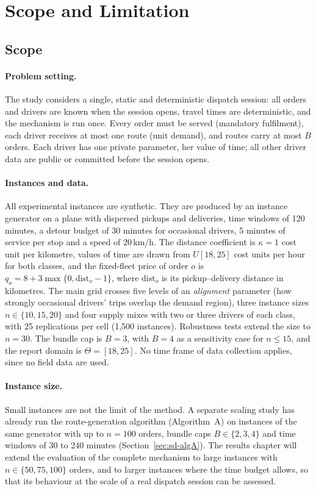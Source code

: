 \section{Scope and Limitation}
\label{sec:scope}

\subsection{Scope}

\paragraph{Problem setting.} The study considers a single, static and
deterministic dispatch session: all orders and drivers are known when the
session opens, travel times are deterministic, and the mechanism is run once.
Every order must be served (mandatory fulfilment), each driver receives at
most one route (unit demand), and routes carry at most $B$ orders. Each
driver has one private parameter, her value of time; all other driver data
are public or committed before the session opens.

\paragraph{Instances and data.} All experimental instances are synthetic.
They are produced by an instance generator on a plane with dispersed pickups
and deliveries, time windows of 120 minutes, a detour budget of 30 minutes
for occasional drivers, 5 minutes of service per stop and a speed of
20\,km/h. The distance coefficient is $\kappa=1$ cost unit per kilometre,
values of time are drawn from $U[18,25]$ cost units per hour for both
classes, and the fixed-fleet price of order $o$ is
$q_o=8+3\max\{0,\mathrm{dist}_o-1\}$, where $\mathrm{dist}_o$ is its
pickup--delivery distance in kilometres. The main grid crosses five levels of
an \emph{alignment} parameter (how strongly occasional drivers' trips overlap
the demand region), three instance sizes $n\in\{10,15,20\}$ and four supply
mixes with two or three drivers of each class, with 25 replications per
cell (1,500 instances). Robustness tests extend the size to $n=30$. The
bundle cap is $B=3$, with $B=4$ as a sensitivity case for $n\le 15$, and the
report domain is $\Theta=[18,25]$. No time frame of data collection applies,
since no field data are used.

\paragraph{Instance size.} Small instances are not the limit of the method.
A separate scaling study has already run the route-generation algorithm
(Algorithm~A) on instances of the same generator with up to $n=100$ orders,
bundle caps $B\in\{2,3,4\}$ and time windows of 30 to 240 minutes
(Section~\ref{sec:sd-algA}). The results chapter will extend the evaluation of
the complete mechanism to large instances with $n\in\{50,75,100\}$ orders,
and to larger instances where the time budget allows, so that its
behaviour at the scale of a real dispatch session can be assessed.

